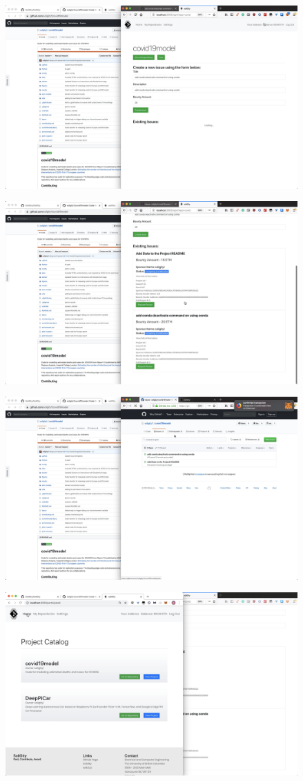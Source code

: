 \documentclass[12pt]{article}
\renewcommand{\_}{\kern-1.5pt\textunderscore\kern-1.5pt}
\begin{document}
\begin{enumerate}
	      \includegraphics[height=7cm]{graphs/27. alice_create_issue2}

	      \includegraphics[height=7cm]{graphs/28. soligity_issues}

	      \includegraphics[height=7cm]{graphs/29. github_issues}

	      \includegraphics[height=7cm]{graphs/30. project_catalog_bob_view}


\end{enumerate}
\end{document}
